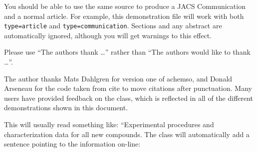 You should be able to use the same source to produce a JACS
Communication and a normal article.  For example, this demonstration
file will work with both \texttt{type=article} and
\texttt{type=communication}. Sections and any abstract are
automatically ignored, although you will get warnings to this effect.

\begin{acknowledgement}

Please use ``The authors thank \ldots'' rather than ``The
authors would like to thank \ldots''.

The author thanks Mats Dahlgren for version one of \textsf{achemso},
and Donald Arseneau for the code taken from \textsf{cite} to move
citations after punctuation. Many users have provided feedback on the
class, which is reflected in all of the different demonstrations
shown in this document.

\end{acknowledgement}

\begin{suppinfo}

This will usually read something like: ``Experimental procedures and
characterization data for all new compounds. The class will
automatically add a sentence pointing to the information on-line:

\end{suppinfo}

